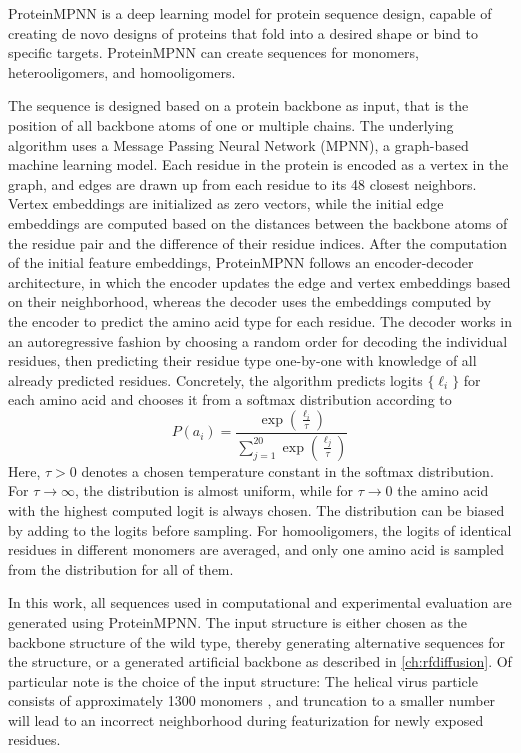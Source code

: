 ProteinMPNN \cite{PMPNN2022} is a deep learning model for protein sequence design, capable of creating de novo designs of proteins that fold into a desired shape or bind to specific targets. ProteinMPNN can create sequences for monomers, heterooligomers, and homooligomers. 

The sequence is designed based on a protein backbone as input, that is the position of all backbone atoms of one or multiple chains. The underlying algorithm uses a Message Passing Neural Network (MPNN), a graph-based machine learning model. Each residue in the protein is encoded as a vertex in the graph, and edges are drawn up from each residue to its 48 closest neighbors. Vertex embeddings are initialized as zero vectors, while the initial edge embeddings are computed based on the distances between the backbone atoms of the residue pair and the difference of their residue indices. After the computation of the initial feature embeddings, ProteinMPNN follows an encoder-decoder architecture, in which the encoder updates the edge and vertex embeddings based on their neighborhood, whereas the decoder uses the embeddings computed by the encoder to predict the amino acid type for each residue. The decoder works in an autoregressive fashion by choosing a random order for decoding the individual residues, then predicting their residue type one-by-one with knowledge of all already predicted residues. Concretely, the algorithm predicts logits $\{\ell_i\}$ for each amino acid and chooses it from a softmax distribution according to
$$P(a_i) = \frac{\exp\left( \frac{\ell_i}{\tau} \right)}{\sum_{j=1}^{20} \exp\left( \frac{\ell_j}{\tau} \right)}$$
Here, $\tau>0$ denotes a chosen temperature constant in the softmax distribution. For $\tau\rightarrow\infty$, the distribution is almost uniform, while for $\tau\rightarrow 0$ the amino acid with the highest computed logit is always chosen. The distribution can be biased by adding to the logits before sampling. For homooligomers, the logits of identical residues in different monomers are averaged, and only one amino acid is sampled from the distribution for all of them. 

In this work, all sequences used in computational and experimental evaluation are generated using ProteinMPNN. The input structure is either chosen as the backbone structure of the wild type, thereby generating alternative sequences for the structure, or a generated artificial backbone as described in \autoref{ch:rfdiffusion}. Of particular note is the choice of the input structure: The helical virus particle consists of approximately 1300 monomers \cite{Grinzato2020}, and truncation to a smaller number will lead to an incorrect neighborhood during featurization for newly exposed residues. 

